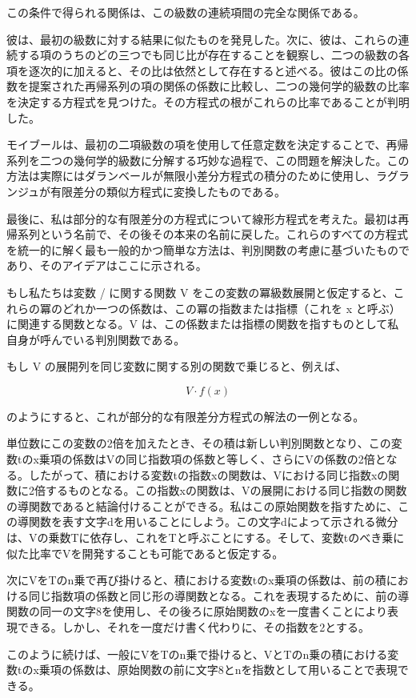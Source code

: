 \documentclass[a4paper,11pt,openany]{ltjsbook}
\begin{document}
この条件で得られる関係は、この級数の連続項間の完全な関係である。

彼は、最初の級数に対する結果に似たものを発見した。次に、彼は、これらの連続する項のうちのどの三つでも同じ比が存在することを観察し、二つの級数の各項を逐次的に加えると、その比は依然として存在すると述べる。彼はこの比の係数を提案された再帰系列の項の関係の係数に比較し、二つの幾何学的級数の比率を決定する方程式を見つけた。その方程式の根がこれらの比率であることが判明した。

モイブールは、最初の二項級数の項を使用して任意定数を決定することで、再帰系列を二つの幾何学的級数に分解する巧妙な過程で、この問題を解決した。この方法は実際にはダランベールが無限小差分方程式の積分のために使用し、ラグランジュが有限差分の類似方程式に変換したものである。

最後に、私は部分的な有限差分の方程式について線形方程式を考えた。最初は再帰系列という名前で、その後その本来の名前に戻した。これらのすべての方程式を統一的に解く最も一般的かつ簡単な方法は、判別関数の考慮に基づいたものであり、そのアイデアはここに示される。

もし私たちは変数 / に関する関数 V をこの変数の冪級数展開と仮定すると、これらの冪のどれか一つの係数は、この冪の指数または指標（これを x と呼ぶ）に関連する関数となる。V は、この係数または指標の関数を指すものとして私自身が呼んでいる判別関数である。

もし V の展開列を同じ変数に関する別の関数で乗じると、例えば、

$$
V \cdot f(x)
$$

のようにすると、これが部分的な有限差分方程式の解法の一例となる。

単位数にこの変数の2倍を加えたとき、その積は新しい判別関数となり、この変数tのx乗項の係数はVの同じ指数項の係数と等しく、さらにVの係数の2倍となる。したがって、積における変数tの指数xの関数は、Vにおける同じ指数xの関数に2倍するものとなる。この指数xの関数は、Vの展開における同じ指数の関数の導関数であると結論付けることができる。私はこの原始関数を指すために、この導関数を表す文字dを用いることにしよう。この文字dによって示される微分は、Vの乗数Tに依存し、これをTと呼ぶことにする。そして、変数tのべき乗に似た比率でVを開発することも可能であると仮定する。

次にVをTのn乗で再び掛けると、積における変数tのx乗項の係数は、前の積における同じ指数項の係数と同じ形の導関数となる。これを表現するために、前の導関数の同一の文字8を使用し、その後ろに原始関数のxを一度書くことにより表現できる。しかし、それを一度だけ書く代わりに、その指数を2とする。

このように続けば、一般にVをTのn乗で掛けると、VとTのn乗の積における変数tのx乗項の係数は、原始関数の前に文字8とnを指数として用いることで表現できる。
\end{document}
